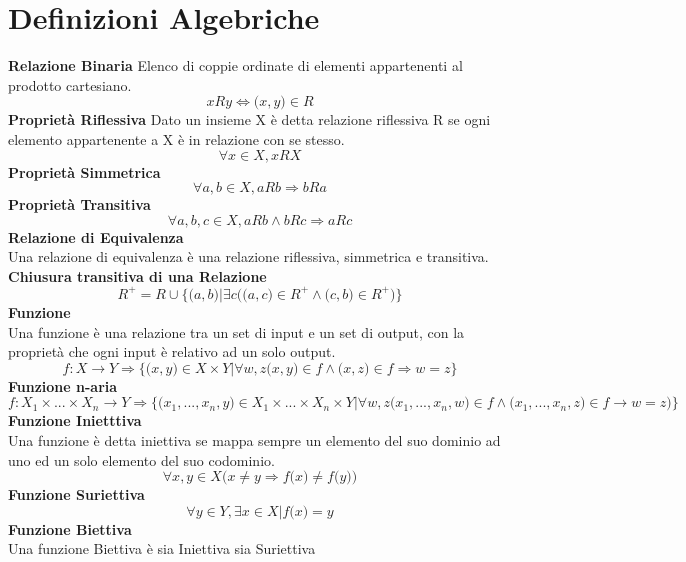 \documentclass{article}
\begin{document}
\section{Definizioni Algebriche}
\textbf{Relazione Binaria}
Elenco di coppie ordinate di elementi appartenenti al prodotto cartesiano.
\begin{equation}
 xRy \iff \big( x,y \big) \in R
 \end{equation}
\textbf{Proprietà Riflessiva}
Dato un insieme X è detta relazione riflessiva R se ogni elemento appartenente a X è in relazione con se stesso.
\begin{equation}
\forall x \in X, xRX
\end{equation}
\textbf{Proprietà Simmetrica}
\begin{equation}
\forall a,b \in X, aRb \Rightarrow bRa
\end{equation}
\textbf{Proprietà Transitiva}
\begin{equation}
\forall a,b,c \in X,aRb \wedge bRc \Rightarrow aRc
\end{equation}
\textbf{Relazione di Equivalenza}
\\
Una relazione di equivalenza è una relazione riflessiva, simmetrica e transitiva.
\\
\textbf{Chiusura transitiva di una Relazione}
\begin{equation}
R^+ = R \cup \{\big( a,b \big) | \exists c \big( \big( a,c \big) \in R^+ \wedge \big( c,b \big) \in R^+ \big) \}
\end{equation}
\textbf{Funzione}
\\
Una funzione è una relazione tra un set di input e un set di output, con la proprietà che ogni input è relativo ad un solo output.
\begin{equation}
f: X \rightarrow Y \Rightarrow \{\big( x,y \big) \in X \times Y | \forall w,z \big( x,y \big) \in f \wedge \big( x,z \big) \in f \Rightarrow w = z \}
\end{equation}
\textbf{Funzione n-aria}
\begin{equation}
f: X_1 \times ... \times X_n \rightarrow Y \Rightarrow \{ \big(x_1,...,x_n,y \big) \in X_1 \times ...\times X_n \times Y |
\forall w,z \big(x_1,...,x_n,w \big) \in f \wedge \big(x_1,...,x_n,z \big) \in f \rightarrow w = z \big) \}
\end{equation}
\textbf{Funzione Inietttiva}
\\
Una funzione è detta iniettiva se mappa sempre un elemento del suo dominio ad uno ed un solo elemento del suo codominio.
\begin{equation}
  \forall x,y \in X \big( x \not = y \Rightarrow f\big( x \big) \not = f \big( y \big) \big)  
\end{equation}
\textbf{Funzione Suriettiva}
\begin{equation}
    \forall y \in Y, \exists x \in X | f \big( x \big) = y
\end{equation}
\textbf{Funzione Biettiva}
\\
Una funzione Biettiva è sia Iniettiva sia Suriettiva
\end{document}
